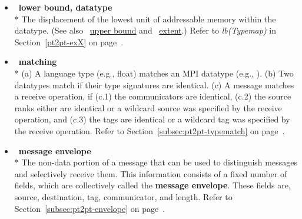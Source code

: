 \begin{itemize}
\label{glossary:lower_bound_datatype}
\item  ~\hypertarget{glossary:lower_bound_datatype}{\textbf{lower bound, datatype}} \\*
The displacement of the lowest unit of addressable memory within the datatype. 
(See also ~\hyperlink{glossary:upper_bound}{upper bound} and ~\hyperlink{glossary:extent}{extent}.)
Refer to \emph{lb(Typemap)} in Section~\ref{pt2pt-exX} on page~\pageref{pt2pt-exX}.

\label{glossary:matching}
\item  ~\hypertarget{glossary:matching}{\textbf{matching}} \\*
(a) A language type (e.g., float) matches an MPI datatype (e.g., ). 
(b) Two datatypes match if their type signatures are identical.
(c) A message matches a receive operation, if (c.1) the communicators are identical, 
(c.2) the source ranks either are identical or a wildcard source was specified by the receive operation, 
and (c.3) the tags are identical or a wildcard tag was specified by the receive operation.
 Refer to Section~\ref{subsec:pt2pt-typematch} on page~\pageref{subsec:pt2pt-typematch}.

\label{glossary:message_envelope}
\item  ~\hypertarget{glossary:message_envelope}{\textbf{message envelope}} \\*
The non-data portion of a message that can be used to
distinguish messages and selectively receive them.  This information consists
of a fixed number of fields, which are collectively called
the {\bf message envelope}.   These fields are, source, 
destination, tag, communicator, and length.
Refer to Section~\ref{subsec:pt2pt-envelope} on page~\pageref{subsec:pt2pt-envelope}.


\end{itemize}
